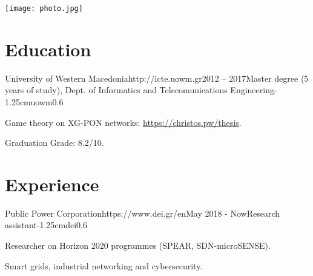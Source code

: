 \documentclass{mycv}
\begin{document}
	\thispagestyle{plain}
	\begin{minipage}{.7\textwidth}
		\begin{flushleft}
			\birth
		\end{flushleft}
	\end{minipage}
	\begin{minipage}{.3\textwidth}
		\begin{flushright}
			\texttt{[image: photo.jpg]}
		\end{flushright}
	\end{minipage}
	\vspace*{-0.75cm}
	\section{Education}
	
	\begin{EntryDatedLogo}{University of Western Macedonia}{http://icte.uowm.gr}{2012 -- 2017}{Master degree (5 years of study), Dept. of Informatics and Telecomunications Engineering}{-1.25cm}{uowm}{0.6}
		\begin{Itemize}
			\item Game theory on XG-PON networks: \url{https://christos.pw/thesis}.
			\item Graduation Grade: 8.2/10.
		\end{Itemize}
	\end{EntryDatedLogo}
	
	\section{Experience}
		\begin{EntryDatedLogo}{Public Power Corporation}{https://www.dei.gr/en}{May 2018 - Now}{Research assistant}{-1.25cm}{dei}{0.6}
		\begin{Itemize}
			\item Researcher on Horizon 2020 programmes (SPEAR, SDN-microSENSE).
			\item Smart grids, industrial networking and cybersecurity.
		\end{Itemize}
	\end{EntryDatedLogo}
	
\end{document}
